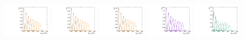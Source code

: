 \begin{figure}[htbp]
  \centering
  \includegraphics[width=0.18\textwidth]{fig/2Dfit/templateSignalVsMX_fromDC_GbuToWW_MVV_mu_HP_nobb_LDy.pdf}
  \includegraphics[width=0.18\textwidth]{fig/2Dfit/templateSignalVsMX_fromDC_RadToWW_MVV_mu_HP_nobb_LDy.pdf}
  \includegraphics[width=0.18\textwidth]{fig/2Dfit/templateSignalVsMX_fromDC_ZprToWW_MVV_mu_HP_nobb_LDy.pdf}
  \includegraphics[width=0.18\textwidth]{fig/2Dfit/templateSignalVsMX_fromDC_WprToWZ_MVV_mu_HP_nobb_LDy.pdf}
  \includegraphics[width=0.18\textwidth]{fig/2Dfit/templateSignalVsMX_fromDC_WprToWH_MVV_mu_HP_nobb_LDy.pdf}\\

\end{figure}
